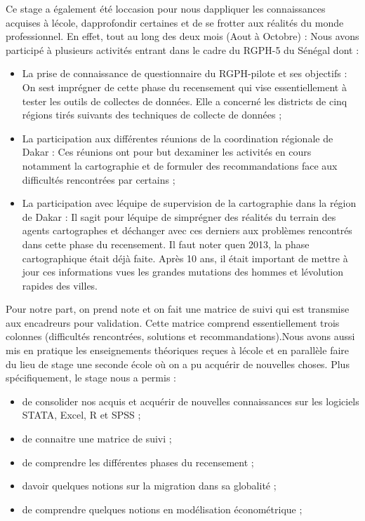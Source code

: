 \documentclass[
  letterpaper,
  DIV=11,
  numbers=noendperiod]{scrartcl}
\begin{document}
Ce stage a également été l\textquotesingle occasion pour nous
d\textquotesingle appliquer les connaissances acquises à
l\textquotesingle école, d\textquotesingle approfondir certaines et de
se frotter aux réalités du monde professionnel. En effet, tout au long
des deux mois (Aout à Octobre) : Nous avons participé à plusieurs
activités entrant dans le cadre du RGPH-5 du Sénégal dont :

\begin{itemize}
\item
  La prise de connaissance de questionnaire du RGPH-pilote et ses
  objectifs : On s\textquotesingle est imprégner de cette phase du
  recensement qui vise essentiellement à tester les outils de collectes
  de données. Elle a concerné les districts de cinq régions tirés
  suivants des techniques de collecte de données ;
\item
  La participation aux différentes réunions de la coordination régionale
  de Dakar : Ces réunions ont pour but d\textquotesingle examiner les
  activités en cours notamment la cartographie et de formuler des
  recommandations face aux difficultés rencontrées par certains ;
\item
  La participation avec l\textquotesingle équipe de supervision de la
  cartographie dans la région de Dakar : Il s\textquotesingle agit pour
  l\textquotesingle équipe de s\textquotesingle imprégner des réalités
  du terrain des agents cartographes et d\textquotesingle échanger avec
  ces derniers aux problèmes rencontrés dans cette phase du recensement.
  Il faut noter qu\textquotesingle en 2013, la phase cartographique
  était déjà faite. Après 10 ans, il était important de mettre à jour
  ces informations vues les grandes mutations des hommes et
  l\textquotesingle évolution rapides des villes.
\end{itemize}

Pour notre part, on prend note et on fait une matrice de suivi qui est
transmise aux encadreurs pour validation. Cette matrice comprend
essentiellement trois colonnes (difficultés rencontrées, solutions et
recommandations).Nous avons aussi mis en pratique les enseignements
théoriques reçues à l\textquotesingle école et en parallèle faire du
lieu de stage une seconde école où on a pu acquérir de nouvelles choses.
Plus spécifiquement, le stage nous a permis :

\begin{itemize}
\item
  de consolider nos acquis et acquérir de nouvelles connaissances sur
  les logiciels STATA, Excel, R et SPSS ;
\item
  de connaitre une matrice de suivi ;
\item
  de comprendre les différentes phases du recensement ;
\item
  d\textquotesingle avoir quelques notions sur la migration dans sa
  globalité ;
\item
  de comprendre quelques notions en modélisation économétrique ;
\end{itemize}
\end{document}
